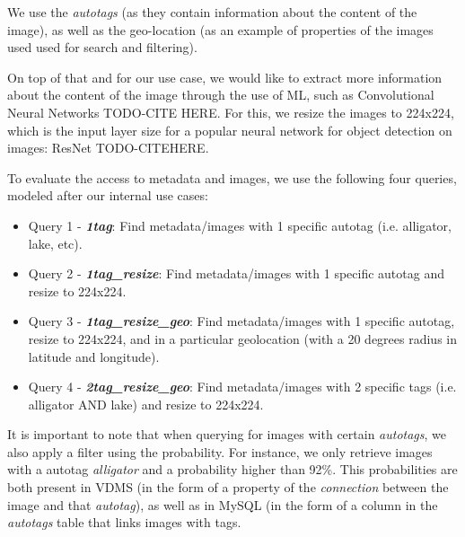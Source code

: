 We use the \textit{autotags} (as they contain information about
the content of the image), as well as the geo-location
(as an example of properties of the images used used for search and filtering).

On top of that and for our use case, we would like to extract more information
about the content of the image through the use of ML,
such as Convolutional Neural Networks TODO-CITE HERE.
For this, we resize the images to 224x224, which is the input layer size for
a popular neural network for object detection on images: ResNet TODO-CITEHERE.

To evaluate the access to metadata and images,
we use the following four queries, modeled after our internal use cases:
\begin{itemize}
\item Query 1 - {\bf {\em 1tag}}: Find metadata/images with 1 specific autotag (i.e. alligator, lake, etc).
\item Query 2 - {\bf {\em 1tag\_resize}}: Find metadata/images with 1 specific autotag and resize to 224x224.
\item Query 3 - {\bf {\em 1tag\_resize\_geo}}: Find metadata/images with 1 specific autotag, resize to 224x224, and in a particular geolocation (with a 20 degrees radius in latitude and longitude).
\item Query 4 - {\bf {\em 2tag\_resize\_geo}}: Find metadata/images with 2 specific tags (i.e. alligator AND lake) and resize to 224x224.
\end{itemize}

It is important to note that when querying for images with certain
\textit{autotags}, we also apply a filter using the probability.
For instance, we only retrieve images with a autotag \textit{alligator}
and a probability higher than 92\%.
This probabilities are both present in VDMS (in the form of a property
of the \textit{connection} between the image and that \textit{autotag}),
as well as in MySQL (in the form of a column in the \textit{autotags} table
that links images with tags.

